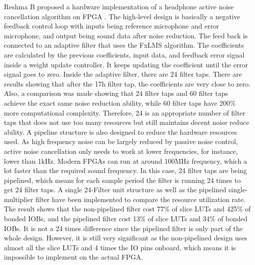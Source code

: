 Reshma B proposed a hardware implementation of a headphone active noise cancellation algorithm on FPGA \cite{ANC_Headphone_3}.  The high-level design is basically a negative feedback control loop with inputs being reference microphone and error microphone, and output being sound data after noise reduction.  The feed back is connected to an adaptive filter that uses the FxLMS algorithm.  The coefficients are calculated by the previous coefficients, input data, and feedback error signal inside a weight update controller.  It keeps updating the coefficient until the error signal goes to zero.  Inside the adaptive filter, there are 24 filter taps.  There are results showing that after the 17h filter tap, the coefficients are very close to zero.  Also, a comparison was made showing that 24 filter taps and 60 filter taps achieve the exact same noise reduction ability, while 60 filter taps have 200\% more computational complexity.  Therefore, 24 is an appropriate number of filter taps that does not use too many resources but still maintains decent noise reduce ability.  A pipeline structure is also designed to reduce the hardware resources used.  As high frequency noise can be largely reduced by passive noise control, active noise cancellation only needs to work at lower frequencies, for instance, lower than 1kHz.  Modern FPGAs can run at around 100MHz frequency, which a lot faster than the required sound frequency.  In this case, 24 filter taps are being pipelined, which means for each sample period the filter is running 24 times to get 24 filter taps.  A single 24-Filter unit structure as well as the pipelined single-multiplier filter have been implemented to compare the resource utilization rate.  The result shows that the non-pipelined filter cost 77\% of slice LUTs and 425\% of bonded IOBs, and the pipelined filter cost 13\% of slice LUTs and 34\% of bonded IOBs.  It is not a 24 times difference since the pipelined filter is only part of the whole design.  However, it is still very significant as the non-pipelined design uses almost all the slice LUTs and 4 times the IO pins onboard, which means it is impossible to implement on the actual FPGA.

